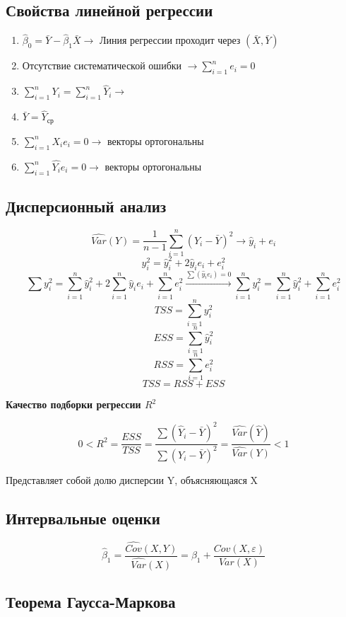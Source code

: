 \documentclass[a4paper, 12pt]{article}
\begin{document}
\subsection{Свойства линейной регрессии}

\begin{enumerate}
    \item $\hat{\beta}_0 = \bar{Y} - \hat{\beta}_1 \bar{X} \rightarrow$ Линия регрессии проходит через $(\bar{X}, \bar{Y})$
    \item Отсутствие систематической ошибки $\rightarrow \sum_{i = 1}^n e_i = 0$
    \item $\sum_{i = 1}^n Y_i = \sum_{i = 1}^n \hat{Y}_i \rightarrow$
    \item $\bar{Y} = \hat{Y}_{\textrm{ср}}$
    \item $\sum_{i = 1}^n X_i e_i = 0 \rightarrow$ векторы ортогональны
    \item $\sum_{i = 1}^n \hat{Y_i} e_i = 0 \rightarrow$ векторы ортогональны
\end{enumerate}

\subsection{Дисперсионный анализ}

\[\hat{Var}(Y) = \frac{1}{n - 1}\sum_{i = 1}^n (Y_i - \bar{Y})^2 \rightarrow \hat{y}_i + e_i\]
\[y_i^2 = \hat{y}_i^2 + 2\hat{y}_i e_i + e_i^2\]
\[\sum y_i^2 = \sum_{i = 1}^n \hat{y}_i^2 + 2 \sum_{i = 1}^n \hat{y}_i e_i + \sum_{i = 1}^n e_i^2 \xrightarrow[]{\sum(\hat{y}_i e_i) = 0} \sum_{i = 1}^n y_i^2 = \sum_{i = 1}^n \hat{y}_i^2 + \sum_{i = 1}^n e_i^2\]
\[TSS = \sum_{i = 1}^n y_i^2\]
\[ESS = \sum_{i = 1}^n \hat{y}_i^2\]
\[RSS = \sum_{i = 1}^n e_i^2\]
\[TSS = RSS + ESS\]

\textbf{Качество подборки регрессии $R^2$}

\[0 < R^{2} = \frac{ESS}{TSS} = \frac{\sum (\hat{Y}_i - \bar{Y})^2}{\sum (Y_i - \bar{Y})^2} =\frac{\hat{Var}(\hat{Y})}{\hat{Var}(Y)}< 1\]

Представляет собой долю дисперсии Y, объясняющаяся X

\subsection{Интервальные оценки}

\[\hat{\beta}_1 = \frac{\hat{Cov}(X, Y)}{\hat{Var}(X)} = \beta_1 + \frac{Cov(X, \varepsilon)}{Var(X)}\]

\subsection{Теорема Гаусса-Маркова}
\end{document}
